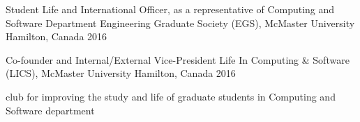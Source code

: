 

\begin{cventries}

  \cventry
    {Student Life and International Officer, as a representative of Computing and Software Department} %
    {Engineering Graduate Society (EGS), McMaster University} %
    {Hamilton, Canada} %
    {2016} %
    {}

  \cventry
    {Co-founder and Internal/External Vice-President} %
    {Life In Computing \& Software (LICS), McMaster University} %
    {Hamilton, Canada} %
    {2016} %
    {
      \begin{cvitems} %
        \item {club for improving the study and life of graduate students in Computing and Software department}
      \end{cvitems}
    }



\end{cventries}
